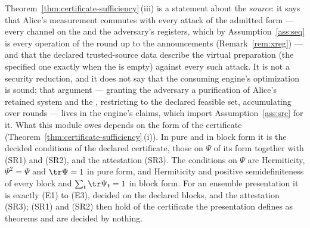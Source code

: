 
\begin{remark}
\label{rem:boundary}
Theorem~\ref{thm:certificate-sufficiency}\,(iii) is a statement about the \emph{source}: it
says that Alice's measurement commutes with every attack of the admitted
form --- every channel on the  and the adversary's
registers, which by Assumption~\ref{ass:seq} is every operation of the
round up to the announcements (Remark~\ref{rem:xreg}) --- and that the
declared trusted-source data describe the virtual preparation (the
specified one exactly when the  is empty) against every such
attack. It is not a security reduction, and it does not say that the
consuming engine's optimization is sound; that argument --- granting the
adversary a purification of Alice's retained system and the
, restricting to the declared feasible set, accumulating over rounds
--- lives in the engine's claims, which import Assumption~\ref{ass:src} for
it. What this module owes depends on the form of the certificate
(Theorem~\ref{thm:certificate-sufficiency}\,(i)). In pure and in block form it is the
decided conditions of the declared certificate, those on $\Psi$ of its form
together with (SR1) and (SR2), and the attestation (SR3). The conditions on $\Psi$
are Hermiticity, $\Psi^2=\Psi$ and $\tr\Psi=1$ in pure form, and Hermiticity
and positive semidefiniteness of every block and $\sum_t\tr\Psi_t=1$ in block
form. For an ensemble presentation it is exactly (E1) to (E3), decided on
the declared blocks, and the attestation (SR3); (SR1) and (SR2) then hold of
the certificate the presentation defines as theorems and are decided by
nothing.


\end{remark}
